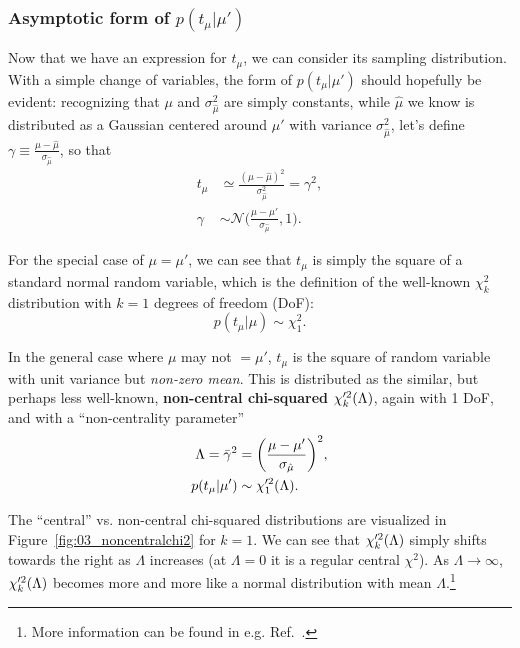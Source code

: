 \subsubsection{Asymptotic form of \texorpdfstring{$p(t_\mu|\mu')$}{p(t\_µ|µ')}}

Now that we have an expression for $t_\mu$, we can consider its sampling distribution.
With a simple change of variables, the form of $p(t_\mu|\mu')$ should hopefully be evident:
recognizing that $\mu$ and $\sigma_{\hat\mu}^2$ are simply constants, while $\hat\mu$ we know is distributed as a Gaussian centered around $\mu'$ with variance $\sigma_{\hat\mu}^2$, let's define $\gamma \equiv \frac{\mu-\hat\mu}{\sigma_{\hat\mu}}$, so that
\begin{align}
    t_\mu &\simeq \frac{(\mu-\hat\mu)^2}{\sigma_{\hat\mu}^2} = \gamma^2, \\
    \gamma &\sim \mathcal N \bigg(\frac{\mu - \mu'}{\sigma_{\hat\mu}}, 1 \bigg).
\label{eq:03_plr_gamma}
\end{align}

For the special case of $\mu = \mu'$, we can see that $t_\mu$ is simply the square of a standard normal random variable, which is the definition of the well-known $\chi^2_k$ distribution with $k=1$ degrees of freedom (DoF):
\begin{equation}
    p(t_\mu|\mu) \sim \chi^2_1.
\label{eq:03_chi2}
\end{equation}

In the general case where $\mu$ may not $ = \mu'$, $t_\mu$ is the square of random variable with unit variance but \textit{non-zero mean}.
This is distributed as the similar, but perhaps less well-known, \textbf{non-central chi-squared $\chi^{\prime 2}_k(\Lambda)$}, again with 1 DoF, and with a ``non-centrality parameter'' 
\begin{align}
    \Lambda = \bar\gamma^2 &= \bigg(\frac{\mu - \mu'}{\sigma_{\hat\mu}}\bigg)^2,  
  \label{eq:03_Lambda} \\
    p(t_\mu|\mu') &\sim \chi^{\prime 2}_1(\Lambda).
  \label{eq:03_noncentralchi2}
\end{align}

The ``central'' vs. non-central chi-squared distributions are visualized in Figure~\ref{fig:03_noncentralchi2} for $k = 1$.
We can see that $\chi^{\prime 2}_k(\Lambda)$ simply shifts towards the right as $\Lambda$ increases (at $\Lambda = 0$ it is a regular central $\chi^2$).
As $\Lambda \rightarrow \infty$, $\chi^{\prime 2}_k(\Lambda)$ becomes more and more like a normal distribution with mean $\Lambda$.\footnote{More information can be found in e.g. Ref.~\cite{enwiki:1256854724}.
}

